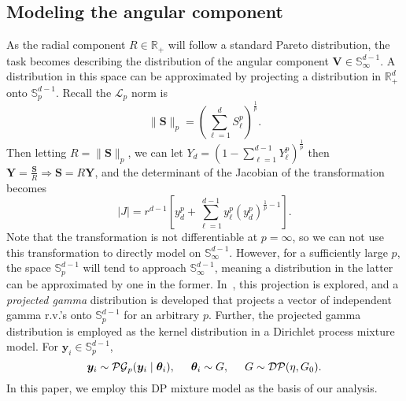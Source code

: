 \subsection{Modeling the angular component}
As the radial component $R \in {\mathbb R}_+$ will follow a standard Pareto 
    distribution, the task becomes describing the distribution of the angular component 
    $\bm{V}\in {\mathbb S}_{\infty}^{d-1}$.  A distribution in this space can be
    approximated by projecting a distribution in $\mathbb{R}_+^d$ onto $\mathbb{S}_{p}^{d-1}$.
    Recall the $\mathcal{L}_p$ norm is 
    \[
        \lVert \bm{S} \rVert_p = \left(\sum_{\ell = 1}^d S_{\ell}^p\right)^{\frac{1}{p}}.
    \]
    Then letting $R = \lVert \bm{S}\rVert_p$, we can let 
    $Y_d = \left(1 - \sum_{\ell = 1}^{d-1}Y_{\ell}^{p}\right)^{\frac{1}{p}}$ 
    then $\bm{Y} = \frac{\bm{S}}{R}\Rightarrow \bm{S} = R\bm{Y}$, 
    and the determinant of the Jacobian of the transformation becomes
    \[
        \lvert J \rvert = r^{d-1}\left[y_d^p + \sum_{\ell = 1}^{d-1}y_{\ell}^p\left(y_d^p\right)^{\frac{1}{p} - 1} \right].
    \]
    Note that the transformation is not differentiable at $p = \infty$, so we can not use this 
    transformation to directly model on ${\mathbb S}_{\infty}^{d-1}$.
    However, for a sufficiently large $p$, the space ${\mathbb S}_p^{d-1}$ will tend
    to approach $\mathbb{S}_{\infty}^{d-1}$, meaning a distribution in the latter can be 
    approximated by one in the former.  In~\cite{trubey:pg}, this projection is explored, and
    a \emph{projected gamma} distribution is developed that projects a vector of independent gamma r.v.'s 
    onto $\mathbb{S}_{p}^{d-1}$ for an arbitrary $p$.  Further, the projected gamma distribution is
    employed as the kernel distribution in a Dirichlet process mixture model.  For $\bm{y}_i\in \mathbb{S}_{p}^{d-1}$,
    \[
        \bm{y}_i \sim \mathcal{PG}_{p}(\bm{y}_i\mid\bm{\theta}_i),\hspace{0.5cm}\bm{\theta}_i\sim G,\hspace{0.5cm}G\sim \mathcal{DP}(\eta, G_0).
    \]
    In this paper, we employ this DP mixture model as the basis of our analysis.



